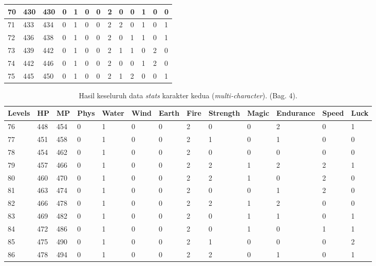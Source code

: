 \begin{sidewaystable}[!h]
\begin{tabular}{|l|l|l|l|l|l|l|l|l|l|l|l|l|}
		70 & 430 & 430 & 0 & 1 & 0 & 0 & 2 & 0 & 0 & 1 & 0 & 0 \\ \hline
		71 & 433 & 434 & 0 & 1 & 0 & 0 & 2 & 2 & 0 & 1 & 0 & 1 \\ \hline
		72 & 436 & 438 & 0 & 1 & 0 & 0 & 2 & 0 & 1 & 1 & 0 & 1 \\ \hline
		73 & 439 & 442 & 0 & 1 & 0 & 0 & 2 & 1 & 1 & 0 & 2 & 0 \\ \hline
		74 & 442 & 446 & 0 & 1 & 0 & 0 & 2 & 0 & 0 & 1 & 2 & 0 \\ \hline
		75 & 445 & 450 & 0 & 1 & 0 & 0 & 2 & 1 & 2 & 0 & 0 & 1 \\ \hline
	\end{tabular}
\end{sidewaystable}
\clearpage


\begin{sidewaystable}[!h]
	\centering
	\caption{Hasil keseluruh data \textit{stats} karakter kedua (\textit{multi-character}). (Bag. 4).}
	\label{tb:player_all_stats_4_2}
	\vspace{1ex}
	\begin{tabular}{|l|l|l|l|l|l|l|l|l|l|l|l|l|}
		\hline
		\rowcolor[HTML]{C0C0C0} 
		\textbf{Levels} & \textbf{HP} & \textbf{MP} & \textbf{Phys} & \textbf{Water} & \textbf{Wind} & \textbf{Earth} & \textbf{Fire} & \textbf{Strength} & \textbf{Magic} & \textbf{Endurance} & \textbf{Speed} & \textbf{Luck} \\ \hline	
		76 & 448 & 454 & 0 & 1 & 0 & 0 & 2 & 0 & 0 & 2 & 0 & 1 \\ \hline
		77 & 451 & 458 & 0 & 1 & 0 & 0 & 2 & 1 & 0 & 1 & 0 & 0 \\ \hline
		78 & 454 & 462 & 0 & 1 & 0 & 0 & 2 & 0 & 0 & 0 & 0 & 0 \\ \hline
		79 & 457 & 466 & 0 & 1 & 0 & 0 & 2 & 2 & 1 & 2 & 2 & 1 \\ \hline
		80 & 460 & 470 & 0 & 1 & 0 & 0 & 2 & 2 & 1 & 0 & 2 & 0 \\ \hline
		81 & 463 & 474 & 0 & 1 & 0 & 0 & 2 & 0 & 0 & 1 & 2 & 0 \\ \hline
		82 & 466 & 478 & 0 & 1 & 0 & 0 & 2 & 2 & 1 & 2 & 0 & 0 \\ \hline
		83 & 469 & 482 & 0 & 1 & 0 & 0 & 2 & 0 & 1 & 1 & 0 & 1 \\ \hline
		84 & 472 & 486 & 0 & 1 & 0 & 0 & 2 & 0 & 1 & 0 & 1 & 1 \\ \hline
		85 & 475 & 490 & 0 & 1 & 0 & 0 & 2 & 1 & 0 & 0 & 0 & 2 \\ \hline
		86 & 478 & 494 & 0 & 1 & 0 & 0 & 2 & 2 & 0 & 1 & 0 & 1 \\ \hline

\end{tabular}
\end{sidewaystable}
